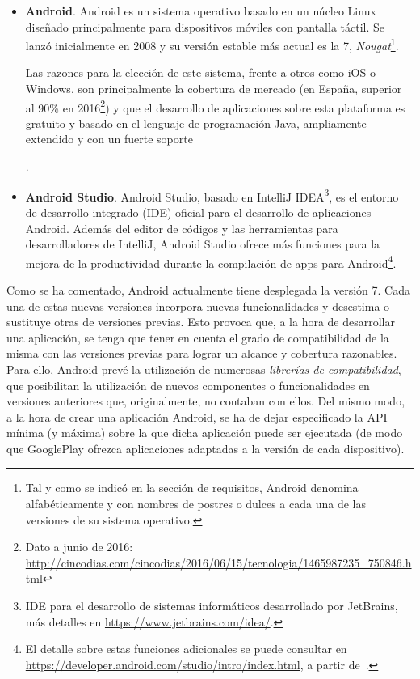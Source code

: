 \begin{itemize}
	\item{\textbf{Android}. Android es un sistema operativo basado en un núcleo Linux diseñado principalmente para dispositivos móviles con pantalla táctil. Se lanzó inicialmente en 2008 y su versión estable más actual es la 7, \textit{Nougat}\footnote{Tal y como se indicó en la sección de requisitos, Android denomina alfabéticamente y con nombres de postres o dulces a cada una de las versiones de su sistema operativo.}.
	
	Las razones para la elección de este sistema, frente a otros como iOS o Windows, son principalmente la cobertura de mercado (en España, superior al 90\% en 2016\footnote{Dato a junio de 2016: \url{http://cincodias.com/cincodias/2016/06/15/tecnologia/1465987235_750846.html}}) y que el desarrollo de aplicaciones sobre esta plataforma es gratuito y basado en el lenguaje de programación Java, ampliamente extendido y con un fuerte soporte}.
	
	\item{\textbf{Android Studio}. Android Studio, basado en IntelliJ IDEA\footnote{IDE para el desarrollo de sistemas informáticos desarrollado por JetBrains, más detalles en \url{https://www.jetbrains.com/idea/}.}, es el entorno de desarrollo integrado (IDE) oficial para el desarrollo de aplicaciones Android. Además del editor de códigos y las herramientas para desarrolladores de IntelliJ, Android Studio ofrece más funciones para la mejora de la productividad durante la compilación de apps para Android\footnote{El detalle sobre estas funciones adicionales se puede consultar en \url{https://developer.android.com/studio/intro/index.html}, a partir de~\cite{AnDev}.}}.
\end{itemize}

Como se ha comentado, Android actualmente tiene desplegada la versión 7. Cada una de estas nuevas versiones incorpora nuevas funcionalidades y desestima o sustituye otras de versiones previas. Esto provoca que, a la hora de desarrollar una aplicación, se tenga que tener en cuenta el grado de compatibilidad de la misma con las versiones previas para lograr un alcance y cobertura razonables. Para ello, Android prevé la utilización de numerosas \emph{librerías de compatibilidad}, que posibilitan la utilización de nuevos componentes o funcionalidades en versiones anteriores que, originalmente, no contaban con ellos. Del mismo modo, a la hora de crear una aplicación Android, se ha de dejar especificado la API mínima (y máxima) sobre la que dicha aplicación puede ser ejecutada (de modo que GooglePlay ofrezca aplicaciones adaptadas a la versión de cada dispositivo).

